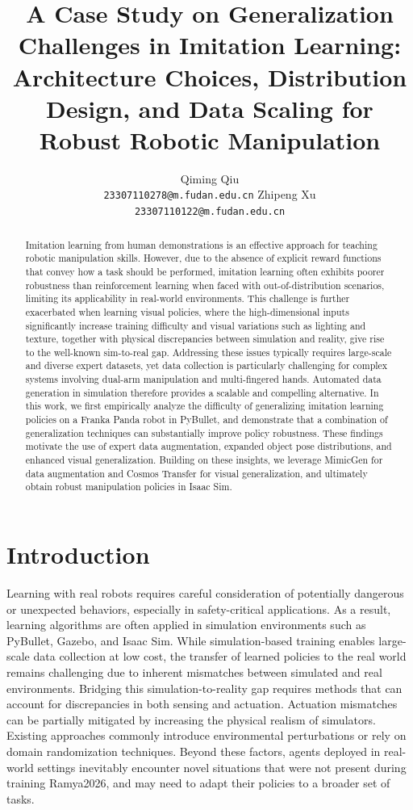 \documentclass{article} %
\title{A Case Study on Generalization Challenges in Imitation Learning: \\ Architecture Choices, Distribution Design, and Data Scaling for Robust Robotic Manipulation}
\author{Qiming Qiu \\ \texttt{23307110278@m.fudan.edu.cn} \And Zhipeng Xu \\ \texttt{23307110122@m.fudan.edu.cn}
}
\begin{document}
\maketitle

\begin{abstract}
Imitation learning from human demonstrations is an effective approach for teaching robotic manipulation skills. However, due to the absence of explicit reward functions that convey how a task should be performed, imitation learning often exhibits poorer robustness than reinforcement learning when faced with out-of-distribution scenarios, limiting its applicability in real-world environments. This challenge is further exacerbated when learning visual policies, where the high-dimensional inputs significantly increase training difficulty and visual variations such as lighting and texture, together with physical discrepancies between simulation and reality, give rise to the well-known sim-to-real gap. Addressing these issues typically requires large-scale and diverse expert datasets, yet data collection is particularly challenging for complex systems involving dual-arm manipulation and multi-fingered hands. Automated data generation in simulation therefore provides a scalable and compelling alternative. In this work, we first empirically analyze the difficulty of generalizing imitation learning policies on a Franka Panda robot in PyBullet, and demonstrate that a combination of generalization techniques can substantially improve policy robustness. These findings motivate the use of expert data augmentation, expanded object pose distributions, and enhanced visual generalization. Building on these insights, we leverage MimicGen for data augmentation and Cosmos Transfer for visual generalization, and ultimately obtain robust manipulation policies in Isaac Sim.

\end{abstract}

\section{Introduction}
Learning with real robots requires careful consideration of potentially dangerous or unexpected behaviors, especially in safety-critical applications\cite{JMLR:v16:garcia15a}. As a result, learning algorithms are often applied in simulation environments such as PyBullet, Gazebo, and Isaac Sim. While simulation-based training enables large-scale data collection at low cost, the transfer of learned policies to the real world remains challenging due to inherent mismatches between simulated and real environments. Bridging this simulation-to-reality gap requires methods that can account for discrepancies in both sensing and actuation. Actuation mismatches can be partially mitigated by increasing the physical realism of simulators\cite{zhao2020closingsimtorealgapcollaborative}. Existing approaches commonly introduce environmental perturbations or rely on domain randomization techniques\cite{Muratore_2021}\cite{ramakrishnan2020blind}. Beyond these factors, agents deployed in real-world settings inevitably encounter novel situations that were not present during training  {Ramya2026}, and may need to adapt their policies to a broader set of tasks. 
\end{document}
